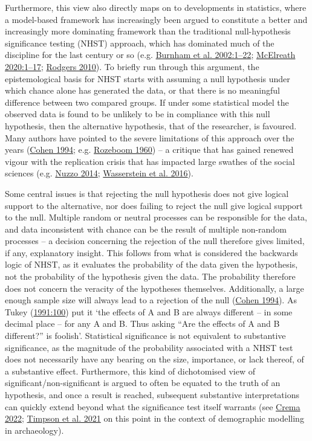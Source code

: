 \documentclass[
  a4paper,
  oneside]{uiophdthesis}
\begin{document}
Furthermore, this view also directly maps on to developments in statistics, where a model-based framework has increasingly been argued to constitute a better and increasingly more dominating framework than the traditional null-hypothesis significance testing (NHST) approach, which has dominated much of the discipline for the last century or so (e.g. \protect\hyperlink{ref-burnham2002}{Burnham et al. 2002:1--22}; \protect\hyperlink{ref-mcelreath2020}{McElreath 2020:1--17}; \protect\hyperlink{ref-rodgers2010}{Rodgers 2010}). To briefly run through this argument, the epistemological basis for NHST starts with assuming a null hypothesis under which chance alone has generated the data, or that there is no meaningful difference between two compared groups. If under some statistical model the observed data is found to be unlikely to be in compliance with this null hypothesis, then the alternative hypothesis, that of the researcher, is favoured. Many authors have pointed to the severe limitations of this approach over the years (\protect\hyperlink{ref-cohen1994}{Cohen 1994}; e.g. \protect\hyperlink{ref-rozeboom1960}{Rozeboom 1960}) -- a critique that has gained renewed vigour with the replication crisis that has impacted large swathes of the social sciences (e.g. \protect\hyperlink{ref-nuzzo2014}{Nuzzo 2014}; \protect\hyperlink{ref-wasserstein2016}{Wasserstein et al. 2016}).

Some central issues is that rejecting the null hypothesis does not give logical support to the alternative, nor does failing to reject the null give logical support to the null. Multiple random or neutral processes can be responsible for the data, and data inconsistent with chance can be the result of multiple non-random processes -- a decision concerning the rejection of the null therefore gives limited, if any, explanatory insight. This follows from what is considered the backwards logic of NHST, as it evaluates the probability of the data given the hypothesis, not the probability of the hypothesis given the data. The probability therefore does not concern the veracity of the hypotheses themselves. Additionally, a large enough sample size will always lead to a rejection of the null (\protect\hyperlink{ref-cohen1994}{Cohen 1994}). As Tukey (\protect\hyperlink{ref-tukey1991}{1991:100}) put it `the effects of A and B are always different -- in some decimal place -- for any A and B. Thus asking ``Are the effects of A and B different?'' is foolish'. Statistical significance is not equivalent to substantive significance, as the magnitude of the probability associated with a NHST test does not necessarily have any bearing on the size, importance, or lack thereof, of a substantive effect. Furthermore, this kind of dichotomised view of significant/non-significant is argued to often be equated to the truth of an hypothesis, and once a result is reached, subsequent substantive interpretations can quickly extend beyond what the significance test itself warrants (see \protect\hyperlink{ref-crema2022}{Crema 2022}; \protect\hyperlink{ref-timpson2021}{Timpson et al. 2021} on this point in the context of demographic modelling in archaeology).
\end{document}

